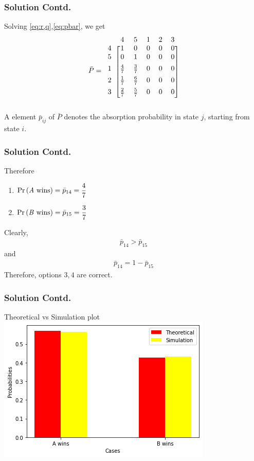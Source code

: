 \documentclass{beamer}
\providecommand{\pr}[1]{\ensuremath{\Pr\left(#1\right)}}
\begin{document}
 \begin{frame}
 \frametitle{Solution Contd.}
 Solving \eqref{eq:r,q},\eqref{eq:pbar}, we get
 \begin{align}
\label{eq:ans}
    \bar P=\begin{blockarray}{cccccc}
&4 & 5 & 1 & 2 & 3 \\
\begin{block}{c[ccccc]}
    4 & 1 & 0 & 0 & 0 & 0 \\
    5 & 0 & 1 & 0 & 0 & 0 \\[1ex]
    1 & \frac{4}{7} & \frac{3}{7} & 0 & 0 & 0 \\[1ex]
    2 & \frac{1}{7} & \frac{6}{7} & 0 & 0 & 0 \\[1ex]
    3 & \frac{2}{7} & \frac{5}{7} & 0 & 0 & 0 \\[1ex]
   \end{block}
\end{blockarray}
\end{align}
 A element $\bar p_{ij}$ of $\bar P$ denotes the absorption probability in state $j$, starting from state $i$. 
\end{frame}

\begin{frame}
 \frametitle{Solution Contd.}
 Therefore
 \begin{enumerate}
    \item $\pr{\text{\textit{A} wins}}=\bar p_{14}=\dfrac{4}{7}$
    \item $\pr{\text{\textit{B} wins}}=\bar p_{15}=\dfrac{3}{7}$
\end{enumerate}
 Clearly,
\begin{align}
\bar p_{14} > \bar p_{15}
\end{align}
and
\begin{align}
\bar p_{14}=1-\bar p_{15}
\end{align}
Therefore, options $3,4$ are correct.
\end{frame}

\begin{frame}
 \frametitle{Solution Contd.}
 Theoretical vs Simulation plot
\centering
\includegraphics[scale=0.65]{Assignment8.png}
 \end{frame}
 
\end{document}
